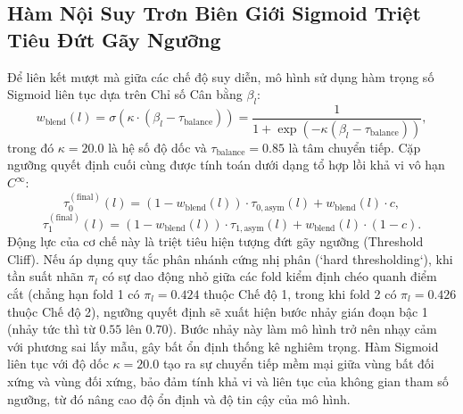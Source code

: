 \documentclass[10pt,a4paper,twoside]{article}
\begin{document}
\subsection{Hàm Nội Suy Trơn Biên Giới Sigmoid Triệt Tiêu Đứt Gãy Ngưỡng}
Để liên kết mượt mà giữa các chế độ suy diễn, mô hình sử dụng hàm trọng số Sigmoid liên tục dựa trên Chỉ số Cân bằng $\beta_l$:
\begin{equation}
w_{\text{blend}}(l) = \sigma\left(\kappa \cdot (\beta_l - \tau_{\text{balance}})\right) = \frac{1}{1 + \exp\left(-\kappa (\beta_l - \tau_{\text{balance}})\right)},
\end{equation}
trong đó $\kappa = 20.0$ là hệ số độ dốc và $\tau_{\text{balance}} = 0.85$ là tâm chuyển tiếp. Cặp ngưỡng quyết định cuối cùng được tính toán dưới dạng tổ hợp lồi khả vi vô hạn $C^\infty$:
\begin{equation}
\tau_0^{(\text{final})}(l) = (1 - w_{\text{blend}}(l)) \cdot \tau_{0,\text{asym}}(l) + w_{\text{blend}}(l) \cdot c,
\end{equation}
\begin{equation}
\tau_1^{(\text{final})}(l) = (1 - w_{\text{blend}}(l)) \cdot \tau_{1,\text{asym}}(l) + w_{\text{blend}}(l) \cdot (1 - c).
\end{equation}
Động lực của cơ chế này là triệt tiêu hiện tượng đứt gãy ngưỡng (Threshold Cliff). Nếu áp dụng quy tắc phân nhánh cứng nhị phân (`hard thresholding`), khi tần suất nhãn $\pi_l$ có sự dao động nhỏ giữa các fold kiểm định chéo quanh điểm cắt (chẳng hạn fold 1 có $\pi_l = 0.424$ thuộc Chế độ 1, trong khi fold 2 có $\pi_l = 0.426$ thuộc Chế độ 2), ngưỡng quyết định sẽ xuất hiện bước nhảy gián đoạn bậc 1 (nhảy tức thì từ $0.55$ lên $0.70$). Bước nhảy này làm mô hình trở nên nhạy cảm với phương sai lấy mẫu, gây bất ổn định thống kê nghiêm trọng. Hàm Sigmoid liên tục với độ dốc $\kappa = 20.0$ tạo ra sự chuyển tiếp mềm mại giữa vùng bất đối xứng và vùng đối xứng, bảo đảm tính khả vi và liên tục của không gian tham số ngưỡng, từ đó nâng cao độ ổn định và độ tin cậy của mô hình.
\end{document}
